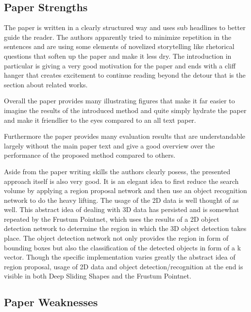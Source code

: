 \documentclass[12pt]{scrartcl}
\begin{document}
\subsection{Paper Strengths} %
\label{sub:paper_strengths}

The paper is written in a clearly structured way and uses sub headlines to
better guide the reader. The authors apparently tried to minimize repetition
in the sentences and are using some elements of novelized storytelling like
rhetorical questions that soften up the paper and make it less dry. The introduction
in particular is giving a very good motivation for the paper and ends with a cliff
hanger that creates excitement to continue reading beyond the detour that is
the section about related works.

Overall the paper provides many illustrating figures that make it far easier
to imagine the results of the introduced method and quite simply hydrate the
paper and make it friendlier to the eyes compared to an all text paper.

Furthermore the paper provides many evaluation results that are understandable
largely without the main paper text and give a good overview over the performance
of the proposed method compared to others.

Aside from the paper writing skills the authors clearly posess, the presented
approach itself is also very good. It is an elegant idea to first reduce the
search volume by applying a region proposal network and then use an object recognition
network to do the heavy lifting. The usage of the 2D data is well thought of
as well. This abstract idea of dealing with 3D data has persisted and is somewhat
repeated by the Frustum Pointnet\cite{Qi2017}, which uses the results of a 2D
object detection network to determine the region in which the 3D object detection
takes place. The object detection network not only provides the region in form
of bounding boxes but also the classification of the detected objects in form
of a k vector. Though the specific implementation varies greatly the abstract
idea of region proposal, usage of 2D data and object detection/recognition at
the end is visible in both Deep Sliding Shapes and the Frustum Pointnet.


\subsection{Paper Weaknesses} %
\label{sub:paper_weaknesses}
\end{document}
